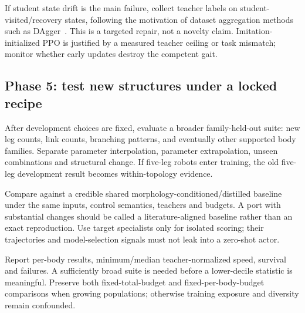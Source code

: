 \documentclass[11pt,letterpaper]{article}
\begin{document}
If student state drift is the main failure, collect teacher labels on
student-visited/recovery states, following the motivation of dataset aggregation
methods such as DAgger~\cite{dagger}. This is a targeted repair, not a novelty
claim. Imitation-initialized PPO is justified by a measured teacher ceiling or
task mismatch; monitor whether early updates destroy the competent gait.

\subsection{Phase 5: test new structures under a locked recipe}
After development choices are fixed, evaluate a broader family-held-out suite:
new leg counts, link counts, branching patterns, and eventually other supported
body families. Separate parameter interpolation, parameter extrapolation,
unseen combinations and structural change. If five-leg robots enter training,
the old five-leg development result becomes within-topology evidence.

Compare against a credible shared morphology-conditioned/distilled baseline
under the same inputs, control semantics, teachers and budgets. A port with
substantial changes should be called a literature-aligned baseline rather than an
exact reproduction. Use target specialists only for isolated scoring; their
trajectories and model-selection signals must not leak into a zero-shot actor.

Report per-body results, minimum/median teacher-normalized speed, survival and
failures. A sufficiently broad suite is needed before a lower-decile statistic
is meaningful. Preserve both fixed-total-budget and fixed-per-body-budget
comparisons when growing populations; otherwise training exposure and diversity
remain confounded.
\end{document}
